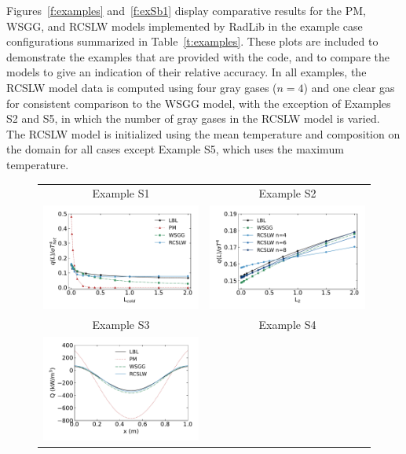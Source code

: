 \documentclass[preprint,12pt]{elsarticle}
\begin{document}
Figures~\ref{f:examples} and~\ref{f:exSb1} display comparative results for the PM, WSGG, and RCSLW models implemented by RadLib in the example case configurations summarized in Table~\ref{t:examples}. These plots are included to demonstrate the examples that are provided with the code, and to compare the models to give an indication of their relative accuracy. In all examples, the RCSLW model data is computed using four gray gases ($n=4$) and one clear gas for consistent comparison to the WSGG model, with the exception of Examples S2 and S5, in which the number of gray gases in the RCSLW model is varied. The RCSLW model is initialized using the mean temperature and composition on the domain for all cases except Example S5, which uses the maximum temperature.
%
\begin{figure}
    \begin{center}
        \begin{tabular}{c c}
            Example S1                                      & Example S2 \\
            \includegraphics[width=2.75 in]{fig_ex_S1.pdf} &
            \includegraphics[width=2.75 in]{fig_ex_S2b.pdf} \\
            Example S3                                      & Example S4 \\
            \includegraphics[width=2.75 in]{fig_ex_S3a.pdf} &

\end{tabular}
\end{center}
\end{figure}
\end{document}
